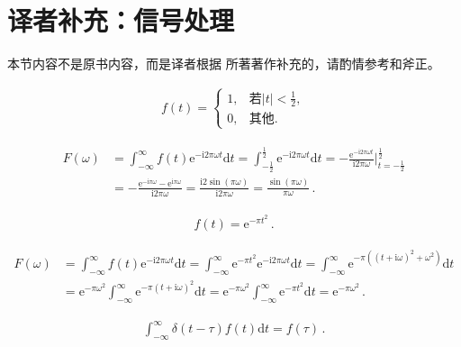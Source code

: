 \section{译者补充：信号处理}\label{sec:译者补充：信号处理}
\begin{remark}
    本节内容不是原书内容，而是译者根据\citet{DigitalSignalProcessing}
    所著著作补充的，请酌情参考和斧正。
\end{remark}

\begin{align}
    f(t)=\left\{\begin{array}{ll}
        1, & \displaystyle\text{若}|t|<\frac{1}{2}, \\
        0, & \text{其他}.
    \end{array}\right.
\end{align}

\begin{align}
    F(\omega) & =\int_{-\infty}^{\infty}f(t)\mathrm{e}^{-\mathrm{i}2\pi\omega t}\mathrm{d}t
    =\int_{-\frac{1}{2}}^{\frac{1}{2}}\mathrm{e}^{-\mathrm{i}2\pi\omega t}\mathrm{d}t
    =-\frac{\mathrm{e}^{-\mathrm{i}2\pi\omega t}}{\mathrm{i}2\pi\omega}\bigg|_{t=-\frac{1}{2}}^{\frac{1}{2}}\nonumber \\
              & =-\frac{\mathrm{e}^{-\mathrm{i}\pi\omega}-\mathrm{e}^{\mathrm{i}\pi\omega}}{\mathrm{i}2\pi\omega}
    =\frac{\mathrm{i}2\sin(\pi\omega)}{\mathrm{i}2\pi\omega}
    =\frac{\sin(\pi\omega)}{\pi\omega}\, .
\end{align}

\begin{align}
    f(t)=\mathrm{e}^{-\pi t^2}\, .
\end{align}

\begin{align}
    F(\omega) & =\int_{-\infty}^{\infty}f(t)\mathrm{e}^{-\mathrm{i}2\pi\omega t}\mathrm{d}t
    =\int_{-\infty}^{\infty}\mathrm{e}^{-\pi t^2}\mathrm{e}^{-\mathrm{i}2\pi\omega t}\mathrm{d}t
    =\int_{-\infty}^{\infty}\mathrm{e}^{-\pi((t+\mathrm{i}\omega)^2+\omega^2)}\mathrm{d}t\nonumber                  \\
              & =\mathrm{e}^{-\pi\omega^2}\int_{-\infty}^{\infty}\mathrm{e}^{-\pi(t+\mathrm{i}\omega)^2}\mathrm{d}t
    =\mathrm{e}^{-\pi\omega^2}\int_{-\infty}^{\infty}\mathrm{e}^{-\pi t^2}\mathrm{d}t
    =\mathrm{e}^{-\pi\omega^2}\, .
\end{align}

\begin{align}
    \int_{-\infty}^{\infty}\delta(t-\tau)f(t)\mathrm{d}t=f(\tau)\, .
\end{align}

